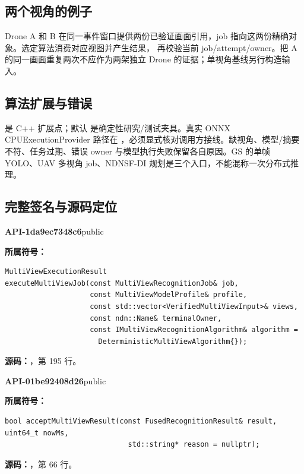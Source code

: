 \subsection{两个视角的例子}
Drone A 和 B 在同一事件窗口提供两份已验证画面引用，job 指向这两份精确对象。选定算法消费对应视图并产生结果， 再校验当前 job/attempt/owner。把 A 的同一画面重复两次不应作为两架独立 Drone 的证据；单视角基线另行构造输入。

\subsection{算法扩展与错误}
 是 C++ 扩展点；默认  是确定性研究/测试夹具。真实 ONNX CPUExecutionProvider 路径在 ，必须显式核对调用方接线。缺视角、模型/摘要不符、任务过期、错误 owner 与模型执行失败保留各自原因。GS 的单帧 YOLO、UAV 多视角 job、NDNSF-DI 规划是三个入口，不能混称一次分布式推理。

\subsection{完整签名与源码定位}

\textbf{API-1da9ec7348c6}\quad public\par
\textbf{所属符号：}\par
\begin{Verbatim}[fontsize=\footnotesize,breaklines,breakanywhere]
MultiViewExecutionResult
executeMultiViewJob(const MultiViewRecognitionJob& job,
                    const MultiViewModelProfile& profile,
                    const std::vector<VerifiedMultiViewInput>& views,
                    const ndn::Name& terminalOwner,
                    const IMultiViewRecognitionAlgorithm& algorithm =
                      DeterministicMultiViewAlgorithm{});
\end{Verbatim}
\textbf{源码：}，第 195 行。\par

\textbf{API-01be92408d26}\quad public\par
\textbf{所属符号：}\par
\begin{Verbatim}[fontsize=\footnotesize,breaklines,breakanywhere]
bool acceptMultiViewResult(const FusedRecognitionResult& result, uint64_t nowMs,
                             std::string* reason = nullptr);
\end{Verbatim}
\textbf{源码：}，第 66 行。\par

